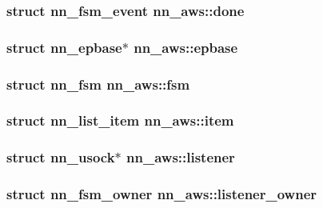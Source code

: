 \subsubsection[{done}]{\setlength{\rightskip}{0pt plus 5cm}struct {\bf nn\+\_\+fsm\+\_\+event} nn\+\_\+aws\+::done}\hypertarget{structnn__aws_a4d64e57f3bd783385b45203c3d4b7197}{}\label{structnn__aws_a4d64e57f3bd783385b45203c3d4b7197}
\subsubsection[{epbase}]{\setlength{\rightskip}{0pt plus 5cm}struct {\bf nn\+\_\+epbase}$\ast$ nn\+\_\+aws\+::epbase}\hypertarget{structnn__aws_aaa7afd36f1c5caae0c8a6c07ba8120e5}{}\label{structnn__aws_aaa7afd36f1c5caae0c8a6c07ba8120e5}
\subsubsection[{fsm}]{\setlength{\rightskip}{0pt plus 5cm}struct {\bf nn\+\_\+fsm} nn\+\_\+aws\+::fsm}\hypertarget{structnn__aws_a4dbdd1d180d0932049d668ef2326dbca}{}\label{structnn__aws_a4dbdd1d180d0932049d668ef2326dbca}
\subsubsection[{item}]{\setlength{\rightskip}{0pt plus 5cm}struct {\bf nn\+\_\+list\+\_\+item} nn\+\_\+aws\+::item}\hypertarget{structnn__aws_a6e4050f21493a55997811caf94b3f6f6}{}\label{structnn__aws_a6e4050f21493a55997811caf94b3f6f6}
\subsubsection[{listener}]{\setlength{\rightskip}{0pt plus 5cm}struct {\bf nn\+\_\+usock}$\ast$ nn\+\_\+aws\+::listener}\hypertarget{structnn__aws_ae45d418c32177d2cb4a170045790c0bb}{}\label{structnn__aws_ae45d418c32177d2cb4a170045790c0bb}
\subsubsection[{listener\+\_\+owner}]{\setlength{\rightskip}{0pt plus 5cm}struct {\bf nn\+\_\+fsm\+\_\+owner} nn\+\_\+aws\+::listener\+\_\+owner}\hypertarget{structnn__aws_ab87ccbd6d0da109f5bf1bd2ce76b031c}{}\label{structnn__aws_ab87ccbd6d0da109f5bf1bd2ce76b031c}

